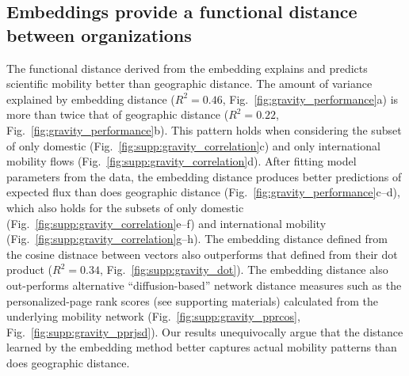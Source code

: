 \documentclass[12pt]{article} %
\begin{document}
%
%
%
\subsection*{Embeddings provide a functional distance between organizations}

The functional distance derived from the embedding explains and predicts scientific mobility better than geographic distance.
The amount of variance explained by embedding distance ($R^{2} = 0.46$, Fig.~\ref{fig:gravity_performance}a) is more than twice that of geographic distance ($R^{2} = 0.22$, Fig.~\ref{fig:gravity_performance}b).
This pattern holds when considering the subset of only domestic (Fig.~\ref{fig:supp:gravity_correlation}c) and only international mobility flows (Fig.~\ref{fig:supp:gravity_correlation}d).
After fitting model parameters from the data, the embedding distance produces better predictions of expected flux than does geographic distance (Fig.~\ref{fig:gravity_performance}c--d), which also holds for the subsets of only domestic (Fig.~\ref{fig:supp:gravity_correlation}e--f) and international mobility (Fig.~\ref{fig:supp:gravity_correlation}g--h).
The embedding distance defined from the cosine distnace between vectors also outperforms that defined from their dot product ($R^{2} = 0.34$, Fig.~\ref{fig:supp:gravity_dot}).
The embedding distance also out-performs alternative ``diffusion-based'' network distance measures such as the personalized-page rank scores (see supporting materials) calculated from the underlying mobility network (Fig.~\ref{fig:supp:gravity_pprcos}, Fig.~\ref{fig:supp:gravity_pprjsd}).
Our results unequivocally argue that the distance learned by the embedding method better captures actual mobility patterns than does geographic distance. 
\end{document}
